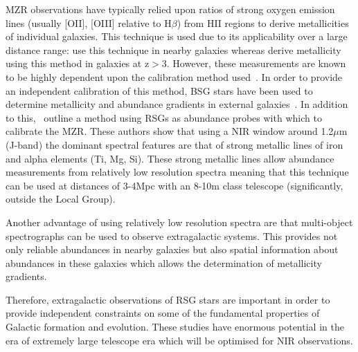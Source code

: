 MZR observations have typically relied upon ratios of strong oxygen emission lines (usually [OII], [OIII] relative to H$\beta$) from HII regions to derive metallicities of individual galaxies.
This technique is used due to its applicability over a large distance range:
\cite{2001MNRAS.323..887C} use this technique in nearby galaxies whereas \cite{Maiolino08} derive metallicity using this method in galaxies at z$>$3.
However, these measurements are known to be highly dependent upon the calibration method used~\citep{Kewley08, Kudritzki08,Bresolin09}.
In order to provide an independent calibration of this method, BSG stars have been used to determine metallicity and abundance gradients in external galaxies~\citep{Kudritzki12}.
In addition to this,~\cite{Davies13b} outline a method using RSGs as abundance probes with which to calibrate the MZR.
These authors show that using a NIR window around 1.2$\mu$m (J-band) the dominant spectral features are that of strong metallic lines of iron and alpha elements (Ti, Mg, Si).
These strong metallic lines allow abundance measurements from relatively low resolution spectra meaning that this technique can be used at distances of 3-4Mpc with an 8-10m class telescope (significantly, outside the Local Group).


Another advantage of using relatively low resolution spectra are that multi-object spectrographs can be used to observe extragalactic systems.
This provides not only reliable abundances in nearby galaxies but also spatial information about abundances in these galaxies which allows the determination of metallicity gradients.

Therefore, extragalactic observations of RSG stars are important in order to provide independent constraints on some of the fundamental properties of Galactic formation and evolution.
These studies have enormous potential in the era of extremely large telescope era which will be optimised for NIR observations.
